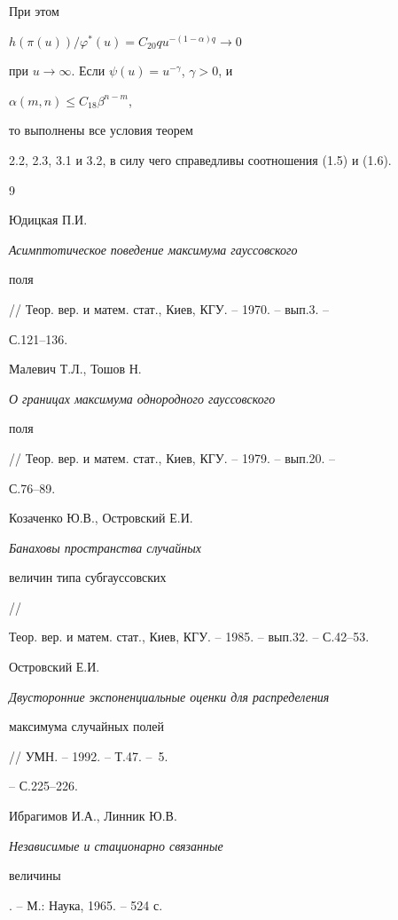 При этом 


$h(\pi(u))/\varphi^*(u)=C_{20}qu^{-(1-\alpha)q}\to 0$ 


при $u\to\infty$. Если $\psi(u)=u^{-\gamma}$, $\gamma>0$, и 


$\alpha(m,n)\le C_{18}\beta^{n-m}$, 


то выполнены все условия теорем 


2.2, 2.3, 3.1 и 3.2, в силу чего справедливы соотношения (1.5) и (1.6). 


 


\begin{thebibliography}{9} 


 




Юдицкая П.И. {\em Асимптотическое поведение максимума гауссовского 


поля} // Теор. вер. и матем. стат., Киев, КГУ. -- 1970. -- вып.3. -- 


С.121--136. 


 




Малевич Т.Л., Тошов Н. {\em О границах максимума однородного гауссовского 


поля} // Теор. вер. и матем. стат., Киев, КГУ. -- 1979. -- вып.20. -- 


С.76--89. 


 




Козаченко Ю.В., Островский Е.И. {\em Банаховы пространства случайных 


величин типа субгауссовских} // 


Теор. вер. и матем. стат., Киев, КГУ. -- 1985. -- вып.32. -- С.42--53. 


 




Островский Е.И. {\em Двусторонние экспоненциальные оценки для распределения 


максимума случайных полей} // УМН. -- 1992. -- Т.47. -- \No\,5. 


-- С.225--226. 


 




Ибрагимов И.А., Линник Ю.В. {\em Независимые и стационарно связанные 


величины}. -- М.: Наука, 1965. -- 524 с. 


 


 


\end{thebibliography} 


 


\vskip 2cm 


 






 


